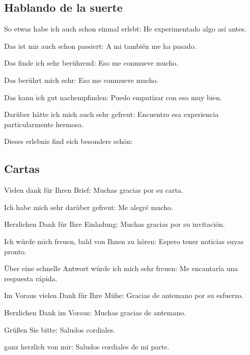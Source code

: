 \subsection{Hablando de la suerte}
\begin{myitemize}
\item So etwas habe ich auch schon einmal erlebt: He experimentado algo así antes.
\item Das ist mir auch schon passiert: A mi también me ha pasado.
\item Das finde ich sehr berührend: Eso me conmueve mucho.
\item Das berührt mich sehr: Eso me conmueve mucho.
\item Das kann ich gut nachempfinden: Puedo empatizar con eso muy bien.
\item Darüber hätte ich mich auch sehr gefreut: Encuentro esa experiencia particularmente hermosa.
\item Dieses erlebnis find eich besonders schön:
\end{myitemize}

\subsection{Cartas}
\begin{myitemize}
\item Vielen dank für Ihren Brief: Muchas gracias por su carta.
\item Ich habe mich sehr darüber gefreut: Me alegré mucho.
\item Herzlichen Dank für Ihre Einladung: Muchas gracias por su invitación.
\item Ich würde mich freuen, bald von Ihnen zu hören: Espero tener noticias suyas pronto.
\item Über eine schnelle Antwort würde ich mich sehr freuen: Me encantaría una respuesta rápida.
\item Im Voraus vielen Dank für Ihre Mühe: Gracias de antemano por su esfuerzo.
\item Herzlichen Dank im Voraus: Muchas gracias de antemano.
\item Grüßen Sie bitte: Saludos cordiales.
\item ganz herzlich von mir: Saludos cordiales de mi parte.
\end{myitemize}